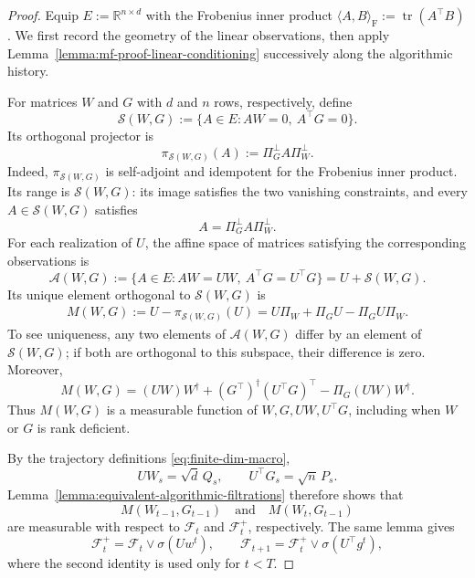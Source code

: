         \begin{proof}
        Equip $E:=\mathbb R^{n\times d}$ with the Frobenius inner
        product
        \(
            \langle A,B\rangle_{\mathrm F}
            :=\operatorname{tr}(A^\top B)
        \).
        We first record the geometry of the linear observations,
        then apply Lemma~\ref{lemma:mf-proof-linear-conditioning}
        successively along the algorithmic history.
        
        For matrices $W$ and $G$ with $d$ and $n$ rows, respectively,
        define
        \[
            \mathcal S(W,G)
            :=
            \{A\in E:AW=0,\ A^\top G=0\}.
        \]
        Its orthogonal projector is
        \[
            \pi_{\mathcal{S}(W,G)}(A)
            :=
            \Pi_G^\perp A\Pi_W^\perp.
        \]
        Indeed, $\pi_{\mathcal{S}(W,G)}$ is self-adjoint and idempotent
        for the Frobenius inner product. Its range is
        $\mathcal S(W,G)$: its image satisfies the two vanishing
        constraints, and every $A\in\mathcal S(W,G)$ satisfies
        \[
            A=\Pi_G^\perp A\Pi_W^\perp.
        \]
        For each realization of $U$, the affine space of matrices
        satisfying the corresponding observations is
        \[
            \mathcal A(W,G)
            :=
            \{A\in E:AW=UW,\ A^\top G=U^\top G\}
            =
            U+\mathcal S(W,G).
        \]
        Its unique element orthogonal to $\mathcal S(W,G)$ is
        \[
        \begin{aligned}
            M(W,G)
            :=
            U-\pi_{\mathcal{S}(W,G)}(U)
            =
            U\Pi_W+\Pi_GU-\Pi_GU\Pi_W.
        \end{aligned}
        \]
        To see uniqueness, any two elements of $\mathcal A(W,G)$
        differ by an element of $\mathcal S(W,G)$; if both are
        orthogonal to this subspace, their difference is zero.
        Moreover,
        \[
            M(W,G)
            =
            (UW)W^\dagger
            +(G^\top)^\dagger(U^\top G)^\top
            -\Pi_G(UW)W^\dagger.
        \]
        Thus $M(W,G)$ is a measurable function of
        $W,G,UW,U^\top G$, including when $W$ or $G$ is rank deficient.
        
        By the trajectory definitions \eqref{eq:finite-dim-macro},
        \[
            UW_s=\sqrt d\,Q_s,
            \qquad
            U^\top G_s=\sqrt n\,P_s.
        \]
        Lemma~\ref{lemma:equivalent-algorithmic-filtrations}
        therefore shows that
        \[
            M(W_{t-1},G_{t-1})
            \quad\text{and}\quad
            M(W_t,G_{t-1})
        \]
        are measurable with respect to $\mathcal F_t$ and
        $\mathcal F_t^+$, respectively. The same lemma gives
        \[
            \mathcal F_t^+
            =
            \mathcal F_t\vee\sigma(Uw^t),
            \qquad
            \mathcal F_{t+1}
            =
            \mathcal F_t^+\vee\sigma(U^\top g^t),
        \]
        where the second identity is used only for $t<T$.
        

\end{proof}
